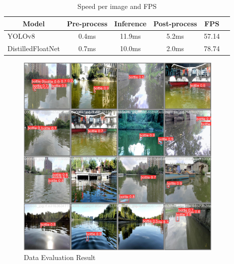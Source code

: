\begin{enumerate}
\begin{table}[H]
    \centering
   
\begin{tabular}{lccccr}
\hline \multicolumn{1}{c}{Model} & Pre-process & Inference & Post-process & FPS\\
\hline 
YOLOv8 & 0.4ms & 11.9ms & 5.2ms & 57.14\\
DistilledFloatNet & 0.7ms  & 10.0ms & 2.0ms & 78.74 \\
\hline
\end{tabular}
\caption{Speed per image and FPS}
 \label{table:training-2}
\end{table}

\begin{figure}[H]
\centering
	\includegraphics*[height=10cm,width = 10cm]{images/Evaluation_image.png}
	 \caption{Data Evaluation Result}
	\label{fig:eval}
\end{figure}







\end{enumerate}
